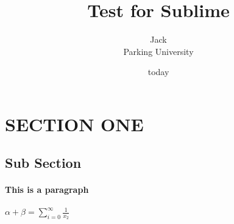 \documentclass[10pt]{article}
\author{Jack\\
		Parking University}
\date{today}
\title{Test for Sublime}
\begin{document}
\maketitle
\section*{SECTION ONE}
\subsection*{Sub Section}
\paragraph{This is a paragraph}
$\alpha+\beta=\sum_{i=0}^{\infty} \frac{1}{x_2}$
\end{document}
